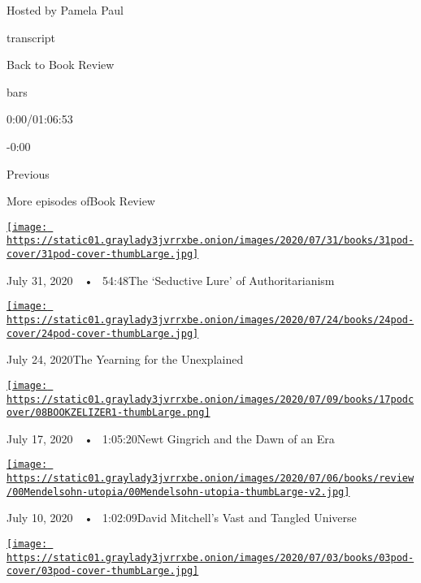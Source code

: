 Hosted by Pamela Paul

transcript

Back to Book Review

bars

0:00/01:06:53

-0:00

Previous

More episodes ofBook Review

\href{https://www.nytimes3xbfgragh.onion/2020/07/31/books/review/podcast-twilight-democracy-anne-applebaum-eat-buddha-barbara-demick.html?action=click\&module=audio-series-bar\&region=header\&pgtype=Article}{\texttt{[image: https://static01.graylady3jvrrxbe.onion/images/2020/07/31/books/31pod-cover/31pod-cover-thumbLarge.jpg]}}

July 31, 2020~~•~ 54:48The `Seductive Lure' of Authoritarianism

\href{https://www.nytimes3xbfgragh.onion/2020/07/24/books/review/podcast-colin-dickey-unexplained-miles-harvey-king-of-confidence.html?action=click\&module=audio-series-bar\&region=header\&pgtype=Article}{\texttt{[image: https://static01.graylady3jvrrxbe.onion/images/2020/07/24/books/24pod-cover/24pod-cover-thumbLarge.jpg]}}

July 24, 2020The Yearning for the Unexplained

\href{https://www.nytimes3xbfgragh.onion/2020/07/17/books/review/podcast-julian-zelizer-burning-down-house-newt-gingrich-notes-silencing-lacy-crawford.html?action=click\&module=audio-series-bar\&region=header\&pgtype=Article}{\texttt{[image: https://static01.graylady3jvrrxbe.onion/images/2020/07/09/books/17podcover/08BOOKZELIZER1-thumbLarge.png]}}

July 17, 2020~~•~ 1:05:20Newt Gingrich and the Dawn of an Era

\href{https://www.nytimes3xbfgragh.onion/2020/07/10/books/review/david-mitchell-utopia-avenue-daniel-mendelsohn-biggest-bluff-poker-maria-konnikova.html?action=click\&module=audio-series-bar\&region=header\&pgtype=Article}{\texttt{[image: https://static01.graylady3jvrrxbe.onion/images/2020/07/06/books/review/00Mendelsohn-utopia/00Mendelsohn-utopia-thumbLarge-v2.jpg]}}

July 10, 2020~~•~ 1:02:09David Mitchell's Vast and Tangled Universe

\href{https://www.nytimes3xbfgragh.onion/2020/07/03/books/review/podcast-jules-feiffer-smart-george-steve-inskeep-imperfect-union.html?action=click\&module=audio-series-bar\&region=header\&pgtype=Article}{\texttt{[image: https://static01.graylady3jvrrxbe.onion/images/2020/07/03/books/03pod-cover/03pod-cover-thumbLarge.jpg]}}

